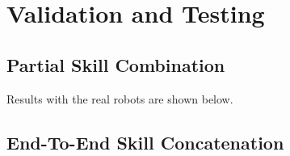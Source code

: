 \chapter{Validation and Testing} 
\label{chap:validation}


\newpage
\section{Partial Skill Combination}
Results with the real robots are shown below.

\newpage
\section{End-To-End Skill Concatenation}

